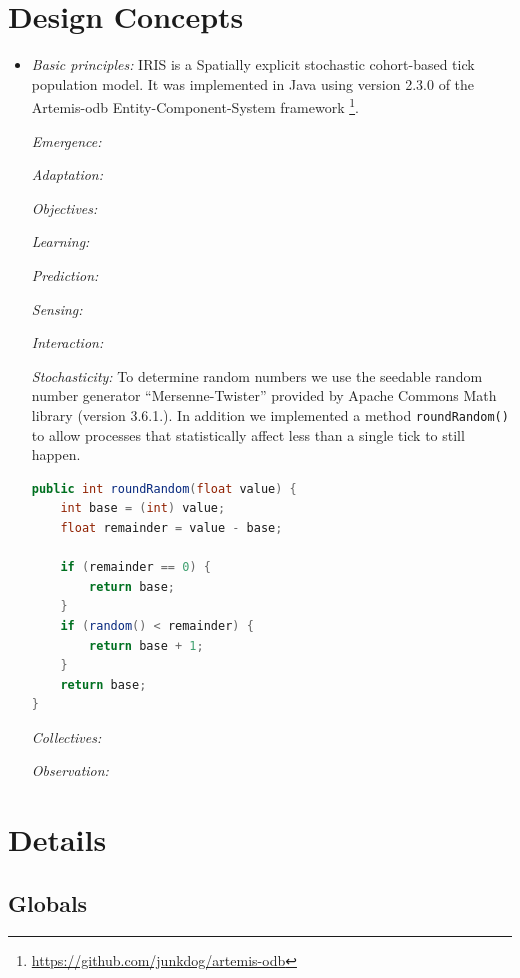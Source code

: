 \documentclass[a4paper, 11pt]{scrartcl}
\newcommand{\inlinecode}[1]{\texttt{\small #1}}
\begin{document}
\newpage
\section{Design Concepts}\label{design_concepts}

\begin{itemize}

\item \emph{Basic principles:}
IRIS is a Spatially explicit stochastic cohort-based tick population model. It was implemented in Java using version 2.3.0 of the Artemis-odb Entity-Component-System framework \footnote{\url{https://github.com/junkdog/artemis-odb}}.

\emph{Emergence:}

\emph{Adaptation:}

\emph{Objectives:}

\emph{Learning:}

\emph{Prediction:}

\emph{Sensing:}

\emph{Interaction:}

\emph{Stochasticity:} To determine random numbers we use the seedable random number generator ``Mersenne-Twister'' provided by Apache Commons Math library (version 3.6.1.). In addition we implemented a method \inlinecode{roundRandom()} to allow processes that statistically affect less than a single tick to still happen.

\begin{singlespace}
\begin{lstlisting}[language = Java, caption = Overview of roundRandom() method]
public int roundRandom(float value) {
	int base = (int) value;
	float remainder = value - base;
	
	if (remainder == 0) {
		return base;
	}
	if (random() < remainder) {
		return base + 1;
	}
	return base;
}
\end{lstlisting}
\end{singlespace}

\emph{Collectives:}

\emph{Observation:}

\end{itemize}


\newpage


\section{Details}

\subsection{Globals}
\end{document}
